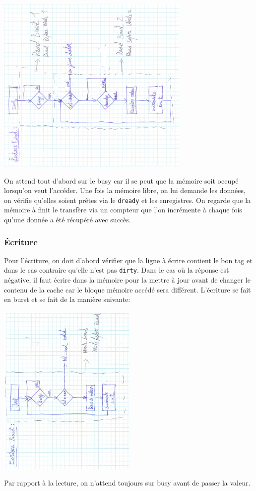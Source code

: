 \documentclass[10pt,a4paper]{article}
\begin{document}
\begin{center}

\includegraphics[width=0.7\textwidth, angle=-90]{images/mss_read}

\end{center}

On attend tout d'abord sur le busy car il se peut que la mémoire soit occupé lorsqu'on veut l’accéder. Une fois la mémoire libre, on lui demande les données, on vérifie qu'elles soient prêtes via le \texttt{dready} et les enregistres. On regarde que la mémoire à finit le transfère via un compteur que l'on incrémente à chaque fois qu'une donnée a été récupéré avec succès.

\subsubsection{Écriture}
Pour l'écriture, on doit d'abord vérifier que la ligne à écrire contient le bon tag et dans le cas contraire qu'elle n'est pas \texttt{dirty}. Dans le cas où la réponse est négative, il faut écrire dans la mémoire pour la mettre à jour avant de changer le contenu de la cache car le bloque mémoire accédé sera différent.
L'écriture se fait en burst et se fait de la manière suivante:  
\begin{center}

\includegraphics[width=0.5\textwidth, angle=-90]{images/mss_write}

\end{center}
Par rapport à la lecture, on n'attend toujours sur busy avant de passer la valeur.\\
\end{document}
